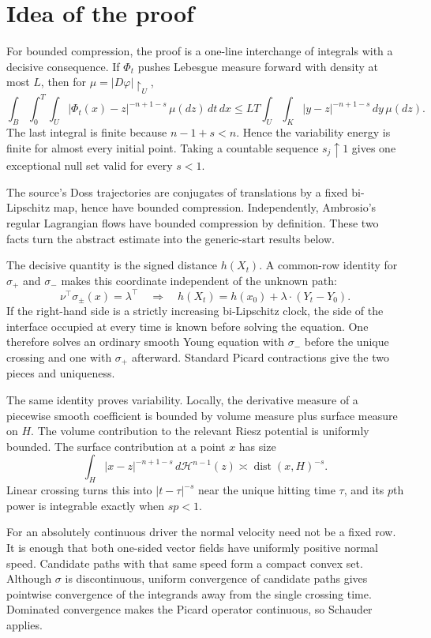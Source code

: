 \documentclass[11pt]{article}
\newcommand{\HH}{\mathcal{H}}
\DeclareMathOperator{\dist}{dist}
\begin{document}
\section{Idea of the proof}

For bounded compression, the proof is a one-line interchange of integrals
with a decisive consequence.  If $\Phi_t$ pushes Lebesgue measure forward
with density at most $L$, then for $\mu=|D\varphi|\restriction_U$,
\[
 \int_B\!\int_0^T\!\int_U
 |\Phi_t(x)-z|^{-n+1-s}\,\mu(dz)\,dt\,dx
 \leq L T\!\int_U\!\int_K |y-z|^{-n+1-s}\,dy\,\mu(dz).
\]
The last integral is finite because $n-1+s<n$.  Hence the variability energy
is finite for almost every initial point.  Taking a countable sequence
$s_j\uparrow1$ gives one exceptional null set valid for every $s<1$.

The source's Doss trajectories are conjugates of translations by a fixed
bi-Lipschitz map, hence have bounded compression.  Independently, Ambrosio's
regular Lagrangian flows have bounded compression by definition.  These two
facts turn the abstract estimate into the generic-start results below.

The decisive quantity is the signed distance $h(X_t)$.  A common-row identity
for $\sigma_+$ and $\sigma_-$ makes this coordinate independent of the unknown
path:
\[
 \nu^\top\sigma_\pm(x)=\lambda^\top
 \quad\Longrightarrow\quad
 h(X_t)=h(x_0)+\lambda\cdot(Y_t-Y_0).
\]
If the right-hand side is a strictly increasing bi-Lipschitz clock, the side
of the interface occupied at every time is known before solving the equation.
One therefore solves an ordinary smooth Young equation with $\sigma_-$ before
the unique crossing and one with $\sigma_+$ afterward.  Standard Picard
contractions give the two pieces and uniqueness.

The same identity proves variability.  Locally, the derivative measure of a
piecewise smooth coefficient is bounded by volume measure plus surface measure
on $H$.  The volume contribution to the relevant Riesz potential is uniformly
bounded.  The surface contribution at a point $x$ has size
\[
 \int_H |x-z|^{-n+1-s}\,d\HH^{n-1}(z)
 \asymp \dist(x,H)^{-s}.
\]
Linear crossing turns this into $|t-\tau|^{-s}$ near the unique hitting time
$\tau$, and its $p$th power is integrable exactly when $sp<1$.

For an absolutely continuous driver the normal velocity need not be a fixed
row.  It is enough that both one-sided vector fields have uniformly positive
normal speed.  Candidate paths with that same speed form a compact convex set.
Although $\sigma$ is discontinuous, uniform convergence of candidate paths
gives pointwise convergence of the integrands away from the single crossing
time.  Dominated convergence makes the Picard operator continuous, so
Schauder applies.
\end{document}
